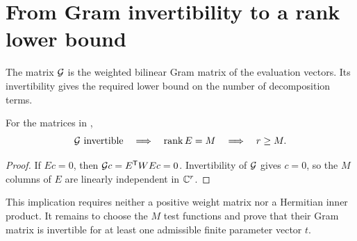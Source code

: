 \section{From Gram invertibility to a rank lower bound}\label{sec:rank}

The matrix $\mathcal G$ is the weighted bilinear Gram matrix of the evaluation
vectors. Its invertibility gives the required lower bound on the
number of decomposition terms.

\begin{lemma}\label{lem:dimension}
For the matrices in ,
\begin{equation}\label{eq:dimension}
\mathcal G\text{ invertible}
\quad\Longrightarrow\quad \operatorname{rank} E=M
\quad\Longrightarrow\quad r\ge M.
\end{equation}
\end{lemma}
\begin{proof}
If $Ec=0$, then $\mathcal G c=E^{\mathsf T}WEc=0$.
Invertibility of $\mathcal G$ gives $c=0$, so the $M$ columns of $E$ are
linearly independent in $\mathbb C^r$.
\end{proof}

This implication requires neither a positive weight matrix nor a
Hermitian inner product. It remains to choose the $M$ test functions
and prove that their Gram matrix is invertible for at least one
admissible finite parameter vector $t$.
